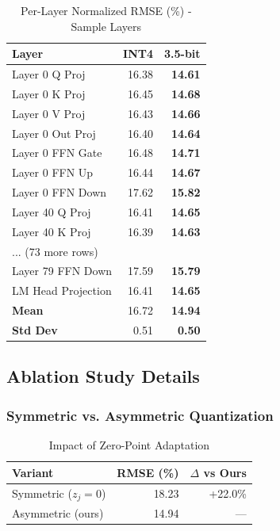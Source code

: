 \documentclass[10pt]{article}
\begin{document}
\begin{table}[h]
\centering
\caption{Per-Layer Normalized RMSE (\%) - Sample Layers}
\label{tab:extended_rmse}
\small
\begin{tabular}{lrr}
\toprule
\textbf{Layer} & \textbf{INT4} & \textbf{3.5-bit} \\
\midrule
Layer 0 Q Proj      & 16.38 & \textbf{14.61} \\
Layer 0 K Proj      & 16.45 & \textbf{14.68} \\
Layer 0 V Proj      & 16.43 & \textbf{14.66} \\
Layer 0 Out Proj    & 16.40 & \textbf{14.64} \\
Layer 0 FFN Gate    & 16.48 & \textbf{14.71} \\
Layer 0 FFN Up      & 16.44 & \textbf{14.67} \\
Layer 0 FFN Down    & 17.62 & \textbf{15.82} \\
\midrule
Layer 40 Q Proj     & 16.41 & \textbf{14.65} \\
Layer 40 K Proj     & 16.39 & \textbf{14.63} \\
... (73 more rows) \\
\midrule
Layer 79 FFN Down   & 17.59 & \textbf{15.79} \\
LM Head Projection  & 16.41 & \textbf{14.65} \\
\midrule
\textbf{Mean}       & 16.72 & \textbf{14.94} \\
\textbf{Std Dev}    & 0.51  & \textbf{0.50} \\
\bottomrule
\end{tabular}
\end{table}

\subsection{Ablation Study Details}

\subsubsection{Symmetric vs. Asymmetric Quantization}

\begin{table}[h]
\centering
\caption{Impact of Zero-Point Adaptation}
\begin{tabular}{lrr}
\toprule
\textbf{Variant} & \textbf{RMSE (\%)} & \textbf{$\Delta$ vs Ours} \\
\midrule
Symmetric ($z_j = 0$)          & 18.23 & +22.0\% \\
Asymmetric (ours)              & 14.94 & ---     \\
\bottomrule
\end{tabular}
\end{table}
\end{document}
